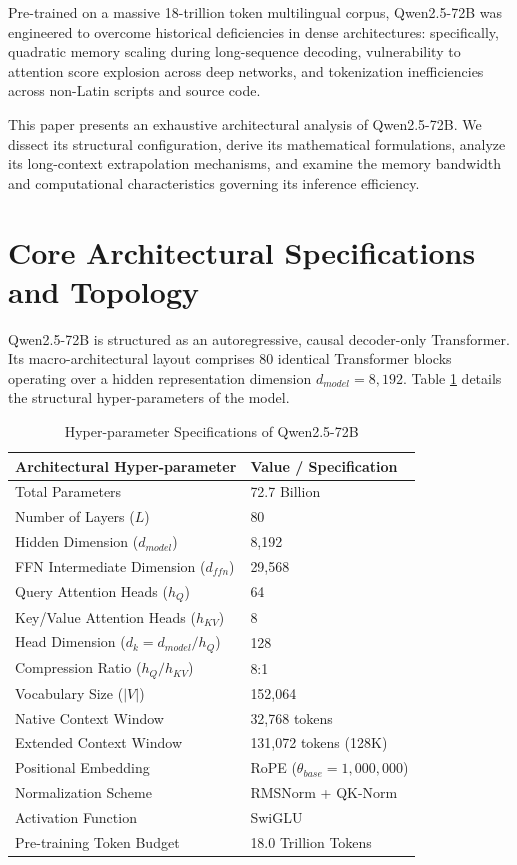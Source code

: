 \documentclass[conference]{IEEEtran}
\begin{document}
Pre-trained on a massive 18-trillion token multilingual corpus, Qwen2.5-72B was engineered to overcome historical deficiencies in dense architectures: specifically, quadratic memory scaling during long-sequence decoding, vulnerability to attention score explosion across deep networks, and tokenization inefficiencies across non-Latin scripts and source code.

This paper presents an exhaustive architectural analysis of Qwen2.5-72B. We dissect its structural configuration, derive its mathematical formulations, analyze its long-context extrapolation mechanisms, and examine the memory bandwidth and computational characteristics governing its inference efficiency.

\section{Core Architectural Specifications and Topology}
Qwen2.5-72B is structured as an autoregressive, causal decoder-only Transformer. Its macro-architectural layout comprises 80 identical Transformer blocks operating over a hidden representation dimension $d_{model} = 8,192$. Table \ref{tab:qwen_specs} details the structural hyper-parameters of the model.

\begin{table}[htbp]
\caption{Hyper-parameter Specifications of Qwen2.5-72B}
\label{tab:qwen_specs}
\centering
\begin{tabular}{ll}
\toprule
\textbf{Architectural Hyper-parameter} & \textbf{Value / Specification} \\
\midrule
Total Parameters & 72.7 Billion \\
Number of Layers ($L$) & 80 \\
Hidden Dimension ($d_{model}$) & 8,192 \\
FFN Intermediate Dimension ($d_{ffn}$) & 29,568 \\
Query Attention Heads ($h_Q$) & 64 \\
Key/Value Attention Heads ($h_{KV}$) & 8 \\
Head Dimension ($d_k = d_{model} / h_Q$) & 128 \\
Compression Ratio ($h_Q / h_{KV}$) & 8:1 \\
Vocabulary Size ($|V|$) & 152,064 \\
Native Context Window & 32,768 tokens \\
Extended Context Window & 131,072 tokens (128K) \\
Positional Embedding & RoPE ($\theta_{base} = 1,000,000$) \\
Normalization Scheme & RMSNorm + QK-Norm \\
Activation Function & SwiGLU \\
Pre-training Token Budget & 18.0 Trillion Tokens \\
\bottomrule
\end{tabular}
\end{table}
\end{document}

